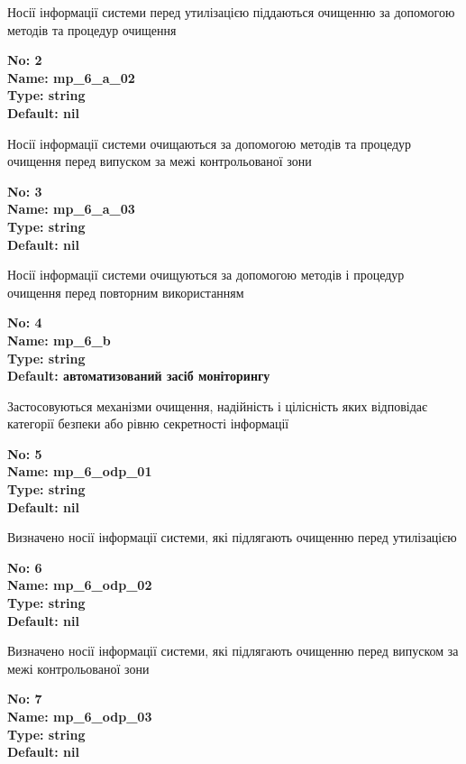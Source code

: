 \documentclass{article}
\begin{document}
{\footnotesize Носії інформації системи перед утилізацією піддаються очищенню за допомогою методів та процедур очищення}


{\footnotesize\bfseries
No: 2\\
Name: mp\_\allowbreak{}6\_\allowbreak{}a\_\allowbreak{}02\\
Type: string\\
Default: nil
}

{\footnotesize Носії інформації системи очищаються за допомогою методів та процедур очищення перед випуском за межі контрольованої зони}


{\footnotesize\bfseries
No: 3\\
Name: mp\_\allowbreak{}6\_\allowbreak{}a\_\allowbreak{}03\\
Type: string\\
Default: nil
}

{\footnotesize Носії інформації системи очищуються за допомогою методів і процедур очищення перед повторним використанням}


{\footnotesize\bfseries
No: 4\\
Name: mp\_\allowbreak{}6\_\allowbreak{}b\\
Type: string\\
Default: \textquotedbl{}автоматизований засіб моніторингу\textquotedbl{}
}

{\footnotesize Застосовуються механізми очищення, надійність і цілісність яких відповідає категорії безпеки або рівню секретності інформації}


{\footnotesize\bfseries
No: 5\\
Name: mp\_\allowbreak{}6\_\allowbreak{}odp\_\allowbreak{}01\\
Type: string\\
Default: nil
}

{\footnotesize Визначено носії інформації системи, які підлягають очищенню перед утилізацією}


{\footnotesize\bfseries
No: 6\\
Name: mp\_\allowbreak{}6\_\allowbreak{}odp\_\allowbreak{}02\\
Type: string\\
Default: nil
}

{\footnotesize Визначено носії інформації системи, які підлягають очищенню перед випуском за межі контрольованої зони}


{\footnotesize\bfseries
No: 7\\
Name: mp\_\allowbreak{}6\_\allowbreak{}odp\_\allowbreak{}03\\
Type: string\\
Default: nil
}
\end{document}
